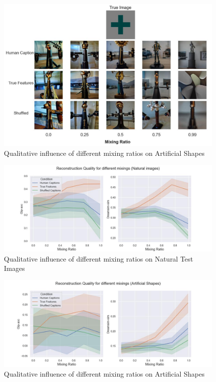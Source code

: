 \begin{figure}[ht]
   \centering
   \includegraphics[width=1\textwidth]{plots/aicap_reconstruction_evolution_art_0.JPEG}
   \caption{Qualitative influence of different mixing ratios on Artificial Shapes}\label{fig:aicap_reconstruction_evolution_art_0}
\end{figure}

\begin{figure}[ht]
   \centering
   \includegraphics[width=1\textwidth]{plots/aicap_reconstruction_quant_evolution_test.JPEG}
   \caption{Qualitative influence of different mixing ratios on Natural Test Images}\label{fig:aicap_reconstruction_quant_evolution_test}
\end{figure}

\begin{figure}[ht]
   \centering
   \includegraphics[width=1\textwidth]{plots/aicap_reconstruction_quant_evolution_art.JPEG}
   \caption{Qualitative influence of different mixing ratios on Artificial Shapes}\label{fig:aicap_reconstruction_quant_evolution_art}
\end{figure}

